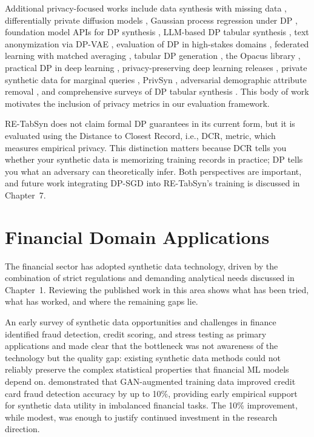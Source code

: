 Additional privacy-focused works include data synthesis with missing data \cite{ge2024dpgen, park2018data}, differentially private diffusion models \cite{dockhorn2023dpddpm}, Gaussian process regression under DP \cite{smith2021dpreg}, foundation model APIs for DP synthesis \cite{ghalebikesabi2023dpsynth}, LLM-based DP tabular synthesis \cite{touati2024dptabllm}, text anonymization via DP-VAE \cite{weggenmann2022dpvae}, evaluation of DP in high-stakes domains \cite{ganev2023dpeval, hittmeir2020evaluating}, federated learning with matched averaging \cite{wang2020fedma}, tabular DP generation \cite{liu2024gentab}, the Opacus library \cite{yousefpour2021opacus}, practical DP in deep learning \cite{mcmahan2017practical}, privacy-preserving deep learning releases \cite{chen2020ppsynth}, private synthetic data for marginal queries \cite{liu2021privsynth}, PrivSyn \cite{zhang2021privsyn}, adversarial demographic attribute removal \cite{elazar2018adversarial}, and comprehensive surveys of DP tabular synthesis \cite{liu2024dptabsurvey}. This body of work motivates the inclusion of privacy metrics in our evaluation framework.

RE-TabSyn does not claim formal DP guarantees in its current form, but it is evaluated using the Distance to Closest Record, i.e., DCR, metric, which measures empirical privacy. This distinction matters because DCR tells you whether your synthetic data is memorizing training records in practice; DP tells you what an adversary can theoretically infer. Both perspectives are important, and future work integrating DP-SGD into RE-TabSyn's training is discussed in Chapter~7.

\section{Financial Domain Applications}

The financial sector has adopted synthetic data technology, driven by the combination of strict regulations and demanding analytical needs discussed in Chapter~1. Reviewing the published work in this area shows what has been tried, what has worked, and where the remaining gaps lie.

An early survey of synthetic data opportunities and challenges in finance \cite{assefa2020synthetic} identified fraud detection, credit scoring, and stress testing as primary applications and made clear that the bottleneck was not awareness of the technology but the quality gap: existing synthetic data methods could not reliably preserve the complex statistical properties that financial ML models depend on. \cite{fiore2019hybrid} demonstrated that GAN-augmented training data improved credit card fraud detection accuracy by up to 10\%, providing early empirical support for synthetic data utility in imbalanced financial tasks. The 10\% improvement, while modest, was enough to justify continued investment in the research direction.

